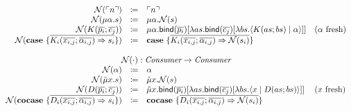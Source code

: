 \[\begin{array}{rcll}
    \name{\lit{n}} & \coloneq & \lit{n} & \\
    \name{\mu\alpha.s} & \coloneq & \mu\alpha.\name{s} & \\
    \name{K(\overline{p_i}; \overline{c_j})} & \coloneq & \mu\alpha.\bind{\overline{p_i}}{\lambda as.\bind{\overline{c_j}}{\lambda bs.\cut{K(as; bs)}{\alpha}}} & \fresh{\alpha} \\
    \name{\case{\overline{K_i(\overline{x_{i,j}}; \overline{\alpha_{i,j}}) \Rightarrow s_i}}} & \coloneq & \case{\overline{K_i(\overline{x_{i,j}}; \overline{\alpha_{i,j}}) \Rightarrow \name{s_i}}} & \\
    \\
    \multicolumn{4}{c}{\name{\cdot} : \emph{Consumer} \rightarrow \emph{Consumer}}\\
    \name{\alpha} & \coloneq & \alpha & \\
    \name{\tilde{\mu}x.s} & \coloneq & \tilde{\mu}x.\name{s} & \\
    \name{D(\overline{p_i}; \overline{c_j})} & \coloneq & \tilde{\mu}x.\bind{\overline{p_i}}{\lambda as.\bind{\overline{c_j}}{\lambda bs.\cut{x}{D(as; bs)}}} & \fresh{x} \\
    \name{\cocase{\overline{D_i(\overline{x_{i,j}}; \overline{\alpha_{i,j}}) \Rightarrow s_i}}} & \coloneq & \cocase{\overline{D_i(\overline{x_{i,j}}; \overline{\alpha_{i,j}}) \Rightarrow \name{s_i}}} & \\
  \end{array}
\]

